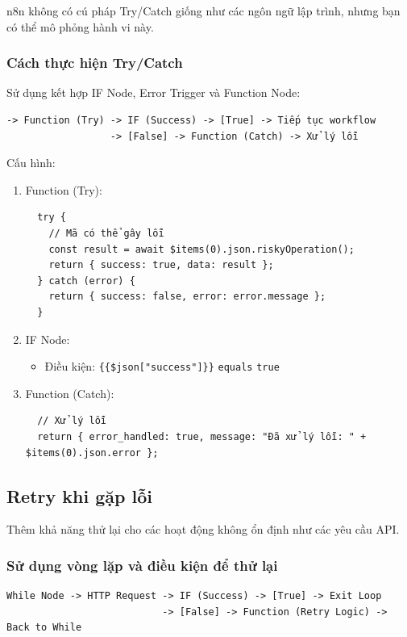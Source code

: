 n8n không có cú pháp Try/Catch giống như các ngôn ngữ lập trình, nhưng bạn có thể mô phỏng hành vi này.

\subsubsection{Cách thực hiện Try/Catch}

Sử dụng kết hợp IF Node, Error Trigger và Function Node:

\begin{verbatim}
-> Function (Try) -> IF (Success) -> [True] -> Tiếp tục workflow
                  -> [False] -> Function (Catch) -> Xử lý lỗi
\end{verbatim}

Cấu hình:
\begin{enumerate}
  \item Function (Try):
  \begin{verbatim}
  try {
    // Mã có thể gây lỗi
    const result = await $items(0).json.riskyOperation();
    return { success: true, data: result };
  } catch (error) {
    return { success: false, error: error.message };
  }
  \end{verbatim}

  \item IF Node:
  \begin{itemize}
    \item Điều kiện: \texttt{\{\{\$json["success"]\}\}} \texttt{equals} \texttt{true}
  \end{itemize}

  \item Function (Catch):
  \begin{verbatim}
  // Xử lý lỗi
  return { error_handled: true, message: "Đã xử lý lỗi: " + $items(0).json.error };
  \end{verbatim}
\end{enumerate}

\subsection{Retry khi gặp lỗi}

Thêm khả năng thử lại cho các hoạt động không ổn định như các yêu cầu API.

\subsubsection{Sử dụng vòng lặp và điều kiện để thử lại}

\begin{verbatim}
While Node -> HTTP Request -> IF (Success) -> [True] -> Exit Loop
                           -> [False] -> Function (Retry Logic) -> Back to While
\end{verbatim}

